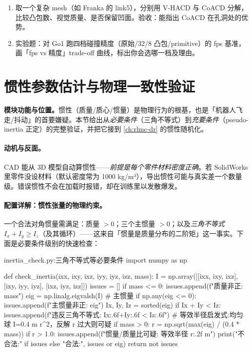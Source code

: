 \begin{practice}[动手：分解与基准]
\begin{enumerate}
  \item 取一个复杂 mesh（如 Franka 的 link5），分别用 V-HACD 与 CoACD 分解，比较凸包数、视觉质量、是否保留凹面。验收：能指出 CoACD 在孔洞处的优势。
  \item 实验题：对 Go1 跑四档碰撞精度（原始/32/8 凸包/primitive）的 fps 基准，画「fps vs 精度」trade-off 曲线，标出你会选哪一档及理由。
\end{enumerate}
\end{practice}

\section{惯性参数估计与物理一致性验证}
\label{sec:rlmc-assets-inertia}

\textbf{模块功能与位置。}惯性（质量/质心/惯量）是物理行为的根基，也是「机器人飞走/抖动」的首要嫌疑。本节给出从\emph{必要条件}（三角不等式）到\emph{充要条件}（pseudo-inertia 正定）的完整验证，并把它接到 \cref{ch:rlmc-dr} 的惯性随机化。

\paragraph{动机与反面。}CAD 能从 3D 模型自动算惯性——\emph{前提是每个零件材料密度正确}。若 SolidWorks 里零件没设材料（默认密度常为 1000 kg/m³），导出惯性可能与真实差一个数量级。错误惯性不会在加载时报错，却在训练里以发散爆发。

\paragraph{配置详解：惯性张量的物理约束。}一个合法对角惯量需满足：质量 $>0$；三个主惯量 $>0$；以及\emph{三角不等式} $I_x+I_y\ge I_z$（及其循环）——这来自「惯量是质量分布的二阶矩」这一事实。下面是必要条件级别的快速检查：

\begin{codebox}[Python]{inertia\_check.py:三角不等式等必要条件}
import numpy as np

def check_inertia(ixx, ixy, ixz, iyy, iyz, izz, mass):
    I = np.array([[ixx, ixy, ixz], [ixy, iyy, iyz], [ixz, iyz, izz]])
    issues = []
    if mass <= 0:
        issues.append(f"质量非正: {mass}")
    eig = np.linalg.eigvalsh(I)              # 主惯量
    if np.any(eig <= 0):
        issues.append(f"主惯量非正: {eig}")
    Ix, Iy, Iz = sorted(eig)
    if Ix + Iy < Iz:
        issues.append(f"违反三角不等式: {Ix:.6f}+{Iy:.6f} < {Iz:.6f}")
    # 等效半径启发式:均匀球 I=0.4 m r^2，反解 r 过大则可疑
    if mass > 0:
        r = np.sqrt(max(eig) / (0.4 * mass))
        if r > 1.0:
            issues.append(f"惯量/质量比可疑: 等效半径 {r:.2f} m")
    print("不合法:" if issues else "合法:", issues or eig)
    return not issues
\end{codebox}

